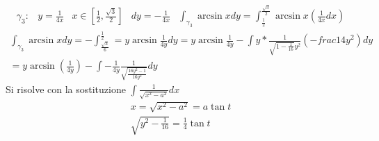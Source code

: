 \begin{esempio}
\begin{equation*}
\begin{matrix}
	\end{matrix}
\end{equation*}
\begin{equation*}
	\begin{matrix}
		\gamma_3: &y=\frac{1}{4x}& x\in \left[\frac{1}{2},
		\frac{\sqrt{3}}{2}\right] & dy=-\frac{1}{4x} & \int_{\gamma_3}\arcsin
		xdy=\int_{\frac{1}{2}}^{\frac{\sqrt{3}}{2}}\arcsin x
		\left(\frac{1}{4x}dx\right)
	\end{matrix}
\end{equation*}
\clearpage
\begin{equation*}
	\begin{matrix}
		\int_{\gamma_3}\arcsin x
		dy=-\int_{\frac{\sqrt{3}}{6}}^{\frac{1}{2}}=y\arcsin \frac{1}{4y}dy=
		y\arcsin \frac{1}{4y}-\int
		y*\frac{1}{\sqrt{1-\frac{1}{16}}y^2}\left(-frac{1}{4y^2}\right)dy\\
		=y\arcsin\left(\frac{1}{4y}\right)-\int-\frac{1}{4y}\frac{1}{\sqrt{\frac{16
		y^2-1}{16y^2}}}dy
	\end{matrix}
\end{equation*}
	Si risolve con la sostituzione $\int\frac{1}{\sqrt{x^2-a^2}}dx$ 
\begin{align*}
	x=\sqrt{x^2-a^2}=a\tan t\\
	\sqrt{y^2-\frac{1}{16}}=\frac{1}{4}\tan t
\end{align*}
\end{esempio}
